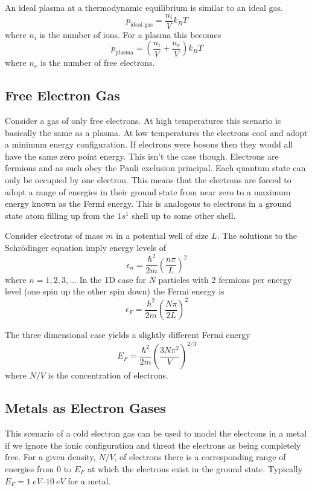     An ideal plasma at a thermodynamic equilibrium is similar to an ideal gas.
    \[p_\text{ideal gas} = \frac{n_i}{V}k_BT\]
    where \(n_i\) is the number of ions.
    For a plasma this becomes
    \[p_\text{plasma} = \left(\frac{n_i}{V} + \frac{n_e}{V}\right)k_BT\]
    where \(n_e\) is the number of free electrons.
    
    \subsection{Free Electron Gas}
    Consider a gas of only free electrons.
    At high temperatures this scenario is basically the same as a plasma.
    At low temperatures the electrons cool and adopt a minimum energy configuration.
    If electrons were bosons then they would all have the same zero point energy.
    This isn't the case though.
    Electrons are fermions and as such obey the Pauli exclusion principal.
    Each quantum state can only be occupied by one electron.
    This means that the electrons are forced to adopt a range of energies in their ground state from near zero to a maximum energy known as the Fermi energy.
    This is analogous to electrons in a ground state atom filling up from the \(1s^1\) shell up to some other shell.
    
    Consider electrons of mass \(m\) in a potential well of size \(L\).
    The solutions to the Schr\"odinger equation imply energy levels of
    \[\epsilon_n = \frac{\hbar^2}{2m}\left(\frac{n\pi}{L}\right)^2\]
    where \(n = 1, 2, 3,\dotsc\)
    In the 1D case for \(N\) particles with 2 fermions per energy level (one spin up the other spin down) the Fermi energy is
    \[\epsilon_F = \frac{\hbar^2}{2m}\left(\frac{N\pi}{2L}\right)^2\]
    
    The three dimensional case yields a slightly different Fermi energy
    \[E_F = \frac{\hbar^2}{2m}\left(\frac{3N\pi^2}{V}\right)^{2/3}\]
    where \(N/V\) is the concentration of electrons.
    
    \subsection{Metals as Electron Gases}
    This scenario of a cold electron gas can be used to model the electrons in a metal if we ignore the ionic configuration and threat the electrons as being completely free.
    For a given density, \(N/V\), of electrons there is a corresponding range of energies from \(0\) to \(E_F\) at which the electrons exist in the ground state.
    Typically \(E_F = \SIrange[range-phrase=-]{1}{10}{eV}\) for a metal.
    
